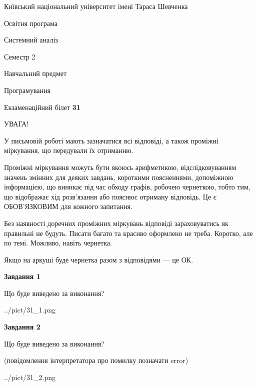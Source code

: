 \documentclass[12pt, ukrainian]{article}
\begin{document}
{{\begin {small}\par
{ \center  Київський національний університет імені Тараса Шевченка \par}
{\parbox {5 cm}{Освітня програма \hfill}{\parbox {7 cm}{Системний аналіз \hfill}}\parbox {6 cm}{\hfill Семестр 2}}\par
{\parbox {5 cm} {Навчальний предмет \hfill}\parbox {7 cm}{Програмування \hfill}\parbox {6cm}{\hfill}\par}\vspace{-7pt} \end{small}}{\center Екзаменаційний білет \No \textbf
{ 31 }\par}}
{
\begin {large}
УВАГА!

У письмовій роботі мають зазначатися всі відповіді, а також проміжні міркування, що передували їх отриманню.

Проміжні міркування можуть бути якоюсь арифметикою, відслідковуванням зна\-чень змінних для деяких завдань,
короткими поясненнями, допоміжною інформацією, що виникає під час обходу графів, робочею чернеткою,
тобто тим, що відображає хід розв’язання або пояснює отриману відповідь.
Це є ОБОВ’ЯЗКОВИМ для кожного запитання.

Без наявності доречних проміжних міркувань відповіді зараховуватись як правиль\-ні не будуть.
Писати багато та красиво оформлено не треба. Коротко, але по темі. Можли\-во, навіть чернетка.

Якщо на аркуші буде чернетка разом з відповідями --- це ОК.

\newpage

{\begin {center}\textbf{Завдання 1}\end {center}}\par
Що буде виведено за виконання?\par
\begin{center}
	{../pict/31_1.png}
\end{center}
\newpage

{\begin {center}\textbf{Завдання 2}\end {center}}\par
Що буде виведено за виконання?\par
 (повідомлення інтерпретатора про помилку позначати error)\par
\begin{center}
	{../pict/31_2.png}
\end{center}
\newpage


\end{large}}
\end{document}
